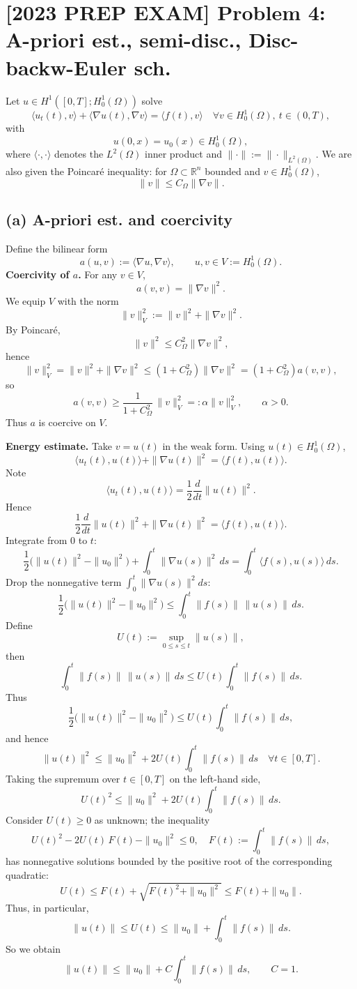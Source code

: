 \section*{[2023 PREP EXAM] Problem 4: A-priori est., semi-disc., Disc-backw-Euler sch.}
Let $u \in H^1([0,T];H^1_0(\Omega))$ solve
\[
    \langle u_t(t), v\rangle + \langle \nabla u(t), \nabla v\rangle = \langle f(t), v\rangle
    \quad \forall v \in H^1_0(\Omega),\ t\in(0,T),
\]
with
\[
    u(0,x) = u_0(x)\in H^1_0(\Omega),
\]
where $\langle\cdot,\cdot\rangle$ denotes the $L^2(\Omega)$ inner product and $\|\cdot\| := \|\cdot\|_{L^2(\Omega)}$.
We are also given the Poincar\'e inequality: for $\Omega\subset\mathbb{R}^n$ bounded and $v\in H^1_0(\Omega)$,
\[
    \|v\| \le C_\Omega \|\nabla v\|.
\]
\subsection*{(a) A-priori est. and coercivity}
Define the bilinear form
\[
    a(u,v) := \langle \nabla u, \nabla v\rangle, \qquad u,v\in V:=H^1_0(\Omega).
\]
\textbf{Coercivity of $a$.}
For any $v \in V$,
\[
    a(v,v) = \|\nabla v\|^2.
\]
We equip $V$ with the norm
\[
    \|v\|_V^2 := \|v\|^2 + \|\nabla v\|^2.
\]
By Poincar\'e,
\[
    \|v\|^2 \le C_\Omega^2 \|\nabla v\|^2,
\]
hence
\[
    \|v\|_V^2 = \|v\|^2 + \|\nabla v\|^2
    \le (1 + C_\Omega^2)\|\nabla v\|^2
    = (1+C_\Omega^2)a(v,v),
\]
so
\[
    a(v,v) \ge \frac{1}{1+C_\Omega^2}\,\|v\|_V^2
    =: \alpha \|v\|_V^2, \qquad \alpha>0.
\]
Thus $a$ is coercive on $V$.

\textbf{Energy estimate.}
Take $v=u(t)$ in the weak form. Using $u(t)\in H^1_0(\Omega)$,
\[
    \langle u_t(t), u(t)\rangle + \|\nabla u(t)\|^2 = \langle f(t), u(t)\rangle.
\]
Note
\[
    \langle u_t(t), u(t)\rangle = \frac{1}{2}\frac{d}{dt}\|u(t)\|^2.
\]
Hence
\[
    \frac{1}{2}\frac{d}{dt}\|u(t)\|^2 + \|\nabla u(t)\|^2 = \langle f(t), u(t)\rangle.
\]
Integrate from $0$ to $t$:
\[
    \frac{1}{2}\bigl(\|u(t)\|^2 - \|u_0\|^2\bigr)
    + \int_0^t \|\nabla u(s)\|^2\,ds
    = \int_0^t \langle f(s), u(s)\rangle\,ds.
\]
Drop the nonnegative term $\int_0^t \|\nabla u(s)\|^2 ds$:
\[
    \frac{1}{2}\bigl(\|u(t)\|^2 - \|u_0\|^2\bigr)
    \le \int_0^t \|f(s)\|\,\|u(s)\|\,ds.
\]
Define
\[
    U(t) := \sup_{0\le s\le t} \|u(s)\|,
\]
then
\[
    \int_0^t \|f(s)\|\,\|u(s)\|\,ds
    \le U(t)\int_0^t \|f(s)\|\,ds.
\]
Thus
\[
    \frac{1}{2}\bigl(\|u(t)\|^2 - \|u_0\|^2\bigr)
    \le U(t) \int_0^t \|f(s)\|\,ds,
\]
and hence
\[
    \|u(t)\|^2
    \le \|u_0\|^2 + 2 U(t) \int_0^t \|f(s)\|\,ds
    \quad\forall t\in[0,T].
\]
Taking the supremum over $t\in[0,T]$ on the left-hand side,
\[
    U(t)^2 \le \|u_0\|^2 + 2 U(t) \int_0^t \|f(s)\|\,ds.
\]
Consider $U(t)\ge 0$ as unknown; the inequality
\[
    U(t)^2 - 2U(t)\,F(t) - \|u_0\|^2 \le 0,
    \quad F(t):=\int_0^t \|f(s)\|\,ds,
\]
has nonnegative solutions bounded by the positive root of the corresponding quadratic:
\[
    U(t) \le F(t) + \sqrt{F(t)^2 + \|u_0\|^2}
    \le F(t) + \|u_0\|.
\]
Thus, in particular,
\[
    \|u(t)\| \le U(t) \le \|u_0\| + \int_0^t \|f(s)\|\,ds.
\]
So we obtain
\[
    \boxed{
        \|u(t)\| \le \|u_0\| + C \int_0^t \|f(s)\|\,ds, \qquad C = 1.
    }
\]
